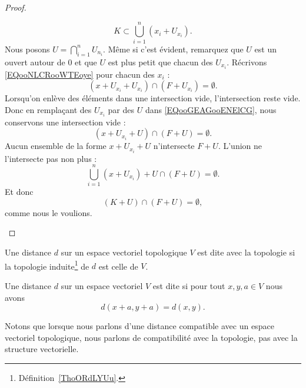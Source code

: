 \begin{proof}
\begin{subproof}
		\begin{equation}
			K\subset\bigcup_{i=1}^n(x_i+U_{x_i}).
		\end{equation}
		Nous posons \( U=\bigcap_{i=1}^nU_{n_i}\). Même si c'est évident, remarquez que \( U\) est un ouvert autour de \( 0\) et que \( U\) est plus petit que chacun des \( U_{x_i}\). Récrivons \eqref{EQooNLCRooWTEoye} pour chacun des \( x_i\) :
		\begin{equation}        \label{EQooGEAGooENElCG}
			(x+U_{x_i}+U_{x_i})\cap (F+U_{x_i})=\emptyset.
		\end{equation}
		Lorsqu'on enlève des éléments dans une intersection vide, l'intersection reste vide. Donc en remplaçant des \( U_{x_i}\) par des \( U\) dans \eqref{EQooGEAGooENElCG}, nous conservons une intersection vide :
		\begin{equation}
			(x+U_{x_i}+U)\cap (F+U)=\emptyset.
		\end{equation}
		\spitem[Conclusion]
		Aucun ensemble de la forme \( x+U_{x_i}+U\) n'intersecte \( F+U\). L'union ne l'intersecte pas non plus :
		\begin{equation}
			\bigcup_{i=1}^n(x+U_{x_i})+U\cap(F+U)=\emptyset.
		\end{equation}
		Et donc
		\begin{equation}
			(K+U)\cap(F+U)=\emptyset,
		\end{equation}
		comme nous le voulions.
	\end{subproof}
\end{proof}

\begin{definition}      \label{DEFooGTOZooRcvGHg}
	Une distance \( d\) sur un espace vectoriel topologique \( V\) est dite  avec la topologie si la topologie induite\footnote{Définition~\ref{ThoORdLYUu}.} de \( d\) est celle de \( V\).
\end{definition}

\begin{definition}      \label{DEFooEUXVooEBYhNU}
	Une distance \( d\) sur un espace vectoriel \( V\) est dite  si pour tout \( x,y,a\in V\) nous avons
	\begin{equation}
		d(x+a,y+a)=d(x,y).
	\end{equation}
\end{definition}
Notons que lorsque nous parlons d'une distance compatible avec un espace vectoriel topologique, nous parlons de compatibilité avec la topologie, pas avec la structure vectorielle.

